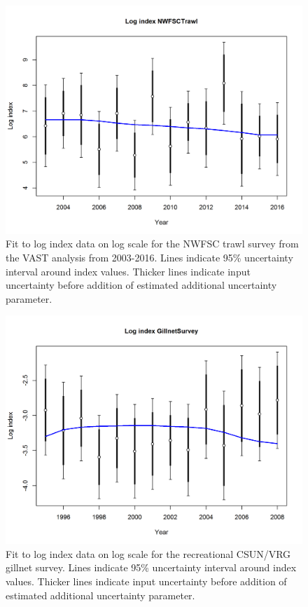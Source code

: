 \documentclass[12pt,]{article}
\begin{document}
\begin{figure}[htbp]
\centering
\includegraphics{r4ss/plots_mod1/index5_logcpuefit_NWFSCtrawl.png}
\caption{Fit to log index data on log scale for the NWFSC trawl survey
from the VAST analysis from 2003-2016. Lines indicate 95\% uncertainty
interval around index values. Thicker lines indicate input uncertainty
before addition of estimated additional uncertainty parameter.
\label{fig:index5_logcpuefit_NWFSCtrawl}}
\end{figure}

\FloatBarrier

\begin{figure}[htbp]
\centering
\includegraphics{r4ss/plots_mod1/index5_logcpuefit_GillnetSurvey.png}
\caption{Fit to log index data on log scale for the recreational
CSUN/VRG gillnet survey. Lines indicate 95\% uncertainty interval around
index values. Thicker lines indicate input uncertainty before addition
of estimated additional uncertainty parameter.
\label{fig:index5_logcpuefit_GillnetSurvey}}
\end{figure}
\end{document}
